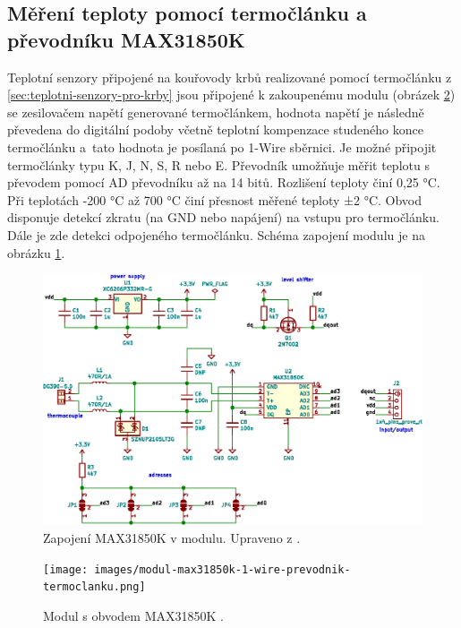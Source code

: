 \subsection{Měření teploty pomocí termočlánku a převodníku MAX31850K}
Teplotní senzory připojené na kouřovody krbů realizované pomocí termočlánku z \ref{sec:teplotni-senzory-pro-krby} jsou připojené k zakoupenému modulu (obrázek \ref{fig:modul-max31850k-1-wire-prevodnik-termoclanku}) se zesilovačem napětí generované termočlánkem, hodnota napětí je následně převedena do digitální podoby včetně teplotní kompenzace studeného konce termočlánku a~tato hodnota je posílaná po 1-Wire sběrnici. Je možné připojit termočlánky typu K, J, N, S, R nebo E. Převodník umožňuje měřit teplotu s převodem pomocí AD převodníku až na 14 bitů. Rozlišení teploty činí 0,25 °C. Při teplotách -200 °C až 700 °C činí přesnost měřené teploty ±2 °C. Obvod disponuje detekcí zkratu (na GND nebo napájení) na vstupu pro termočlánku. Dále je zde detekci odpojeného termočlánku. Schéma zapojení modulu je na obrázku \ref{fig:zapojeni-max31850k-1-wire-prevodnik-termoclanku}.

\begin{figure}[H]
    \centering
    \includegraphics[width=\textwidth]{images/svg/kicad/zapojeni-max31850k-1-wire-prevodnik-termoclanku.eps}
    \caption[Zapojení MAX31850K v modulu.]{Zapojení MAX31850K v modulu. Upraveno z \cite{prevodnik-max31850k}.}
    \label{fig:zapojeni-max31850k-1-wire-prevodnik-termoclanku}
\end{figure}

\begin{figure}[H]
    \centering
    \texttt{[image: images/modul-max31850k-1-wire-prevodnik-termoclanku.png]}
    \caption[Modul s obvodem MAX31850K.]{Modul s obvodem MAX31850K \cite{prevodnik-max31850k}.}
    \label{fig:modul-max31850k-1-wire-prevodnik-termoclanku}
\end{figure}


